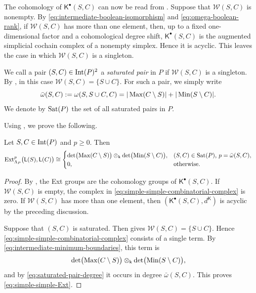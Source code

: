 The cohomology of $\mathsf K^\bullet(S,C)$ can now be read from
.  Suppose that
$\mathcal W(S,C)$ is nonempty.  By
\eqref{eq:intermediate-boolean-isomorphism} and
\eqref{eq:omega-boolean-rank}, if $\mathcal W(S,C)$ has more than one
element, then, up to a fixed one-dimensional factor and a
cohomological degree shift, $\mathsf K^\bullet(S,C)$ is the augmented
simplicial cochain complex of a nonempty simplex.  Hence it is
acyclic.  This leaves the case in which $\mathcal W(S,C)$ is a
singleton.

We call a pair $(S,C)\in\operatorname{Int}(P)^2$ a \emph{saturated pair} in $P$ if
$\mathcal W(S,C)$ is a singleton.  By
, in this case
$\mathcal W(S,C)=\{S\cup C\}$.  For such a pair, we simply write
\begin{equation}
\label{eq:saturated-pair-degree}
\bar\omega(S,C)
:=
\omega(S,S\cup C,C)
=
|\operatorname{Max}(C\setminus S)|
+
|\operatorname{Min}(S\setminus C)|.
\end{equation}
We denote by $\operatorname{Sat}(P)$ the set of all saturated pairs in $P$. 

Using , we prove the following. 

\begin{theorem}
\label{thm:simple-simple-ext-formula}
Let $S,C\in\operatorname{Int}(P)$ and $p\geq0$.  Then
\begin{equation}
\label{eq:simple-simple-Ext}
\operatorname{Ext}^p_{\Lambda_P}\bigl(\mathsf L(S),\mathsf L(C)\bigr)
\cong
\begin{cases}
\det\bigl(\operatorname{Max}(C\setminus S)\bigr)
\otimes_{\mathsf{k}}
\det\bigl(\operatorname{Min}(S\setminus C)\bigr),
&
\text{$(S,C)\in \operatorname{Sat}(P)$, $p=\bar\omega(S,C)$},
\\
0,
&
\text{otherwise}.
\end{cases}
\end{equation}
\end{theorem}

\begin{proof}
By , the Ext groups are
the cohomology groups of $\mathsf K^\bullet(S,C)$.  If
$\mathcal W(S,C)$ is empty, the complex in
\eqref{eq:simple-simple-combinatorial-complex} is zero.  
If $\mathcal W(S,C)$ has more than one element, then
$(\mathsf K^\bullet(S,C),d^{\mathsf K})$ is acyclic by the preceding discussion.

Suppose that $(S,C)$ is saturated.  Then
 gives
$\mathcal W(S,C)=\{S\cup C\}$.  Hence
\eqref{eq:simple-simple-combinatorial-complex} consists of a single
term.  By \eqref{eq:intermediate-minimum-boundaries}, this term is
\begin{equation}
\label{eq:saturated-pair-determinant-line}
\det\bigl(\operatorname{Max}(C\setminus S)\bigr)
\otimes_{\mathsf{k}}
\det\bigl(\operatorname{Min}(S\setminus C)\bigr),
\end{equation}
and by \eqref{eq:saturated-pair-degree} it occurs in degree
$\bar\omega(S,C)$.  This proves
\eqref{eq:simple-simple-Ext}.
\end{proof}




